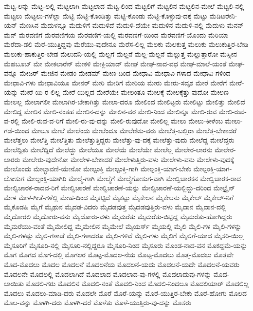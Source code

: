 {ಮೆಟ್ಟ-ಲನ್ನು
ಮೆಟ್ಟ-ಲಲ್ಲಿ
ಮೆಟ್ಟಲಾಗಿ
ಮೆಟ್ಟಲಾದ
ಮೆಟ್ಟ-ಲಿಂದ
ಮೆಟ್ಟಲಿಗೆ
ಮೆಟ್ಟಲಿನ
ಮೆಟ್ಟಲಿನ-ಮೇಲೆ
ಮೆಟ್ಟಲಿ-ನಲ್ಲಿ
ಮೆಟ್ಟಲು
ಮೆಟ್ಟಲು-ಗಳೆಲ್ಲಾ
ಮೆಟ್ಟಿ
ಮೆಟ್ಟಿ-ಕೊಂಡಿತ್ತು
ಮೆಟ್ಟಿ-ಕೊಂಡು
ಮೆಟ್ಟಿ-ಕೊಳ್ಳುವು-ದಕ್ಕೆ
ಮೆಟ್ಟು
ಮೆಡಿಟರೇನಿ-ಯನ್
ಮೆಣಸಿನ
ಮೆದುಳನ್ನೂ
ಮೆದುಳಿಗೆ
ಮೆದುಳಿದೆ
ಮೆದುಳಿ-ದೆಯೇ
ಮೆದುಳಿನ
ಮೆದುಳಿ-ನಲ್ಲಿ
ಮೆದುಳು
ಮೆನನ್
ಮೆನ್
ಮೆರವಣಿಗೆ
ಮೆರವಣಿಗೆಯ
ಮೆರವಣಿಗೆ-ಯಲ್ಲಿ
ಮೆರವಣಿಗೆ-ಯಿಂದ
ಮೆರವಣಿಗೆ-ಯೊಂದು
ಮೆರಿಯಾ
ಮೆರೆದಾ-ಡಲಿ
ಮೆರೆ-ಯುತ್ತಿದ್ದವು
ಮೆರೆಯು-ವುದೇನೂ
ಮೆರೆಸ-ಲಿಲ್ಲ
ಮೆಲಕು
ಮೆಲಕುತ್ತ
ಮೆಲುಕು
ಮೆಲುಕುತ್ತಿರ-ಬೇಡಿ
ಮೆಲುಕು-ಹಾಕುತ್ತಿರ-ಬೇಡ
ಮೆಲುದನಿ-ಯಲ್ಲಿ
ಮೆಲ್ಲಗೆ
ಮೆಲ್ಲನೆ
ಮೆಲ್ಲ-ಮೆಲ್ಲನೆ
ಮೆಲ್ಲುತ್ತ
ಮೆಲ್ಲುತ್ತಾರೋ
ಮೆಸ್ಸೀನ
ಮೆಹಬೂಬ್
ಮೇ
ಮೇಕಲಾರೆನ್
ಮೇಕಳಿ
ಮೇಕ್ಲಿಯಾಡ್
ಮೇಘ
ಮೇಘ-ನಾದ-ವಧ
ಮೇಘ-ಮಾಲೆ-ಯಂತೆ
ಮೇಘ-ವನ್ನೂ
ಮೇಜರ್
ಮೇಜಿನ
ಮೇಡಂ
ಮೇಡಮ್
ಮೇಣ-ದಿಂದ
ಮೇಧಾವಿ
ಮೇಧಾವಿ-ಗಳಾದ
ಮೇಧಾವಿ-ಗಳಿಂದ
ಮೇಧಾವಿ-ಗಳು
ಮೇಧಾವಿಯೂ
ಮೇನರ್
ಮೇರಿ
ಮೇರಿಗೆ
ಮೇರಿಯ
ಮೇರು
ಮೇರು-ಸದೃಶ
ಮೇರೆ
ಮೇರೆಗೆ
ಮೇರೆ-ಯನ್ನು
ಮೇರೆ-ಯಿ-ರ-ಲಿಲ್ಲ
ಮೇರೆ-ಯಿಲ್ಲದ
ಮೇರೆಯೇ
ಮೇಲಂತೂ
ಮೇಲಕ್ಕೆ
ಮೇಲಕ್ಕೆತ್ತು-ವುದೋ
ಮೇಲಣ
ಮೇಲಲ್ಲ
ಮೇಲಾಗಲೀ
ಮೇಲಾಗಿರ-ಬೇಕಾಗಿತ್ತು
ಮೇಲಾ-ದರೂ
ಮೇಲಿಂದ
ಮೇಲಿಟ್ಟರು
ಮೇಲಿಟ್ಟು
ಮೇಲಿತ್ತು
ಮೇಲಿದೆ
ಮೇಲಿದ್ದ
ಮೇಲಿನ
ಮೇಲಿ-ನಂತಹ
ಮೇಲಿನ-ದನ್ನು
ಮೇಲಿನ-ವರ
ಮೇಲಿ-ನಿಂದ
ಮೇಲಿನ್ನೂ
ಮೇಲಿ-ರುವ
ಮೇಲಿ-ರುವ-ವ-ರಲ್ಲಿ
ಮೇಲಿ-ರುವ-ವ-ರಿಗೆ
ಮೇಲಿ-ರು-ವು-ದನ್ನು
ಮೇಲಿ-ರುವುದೋ
ಮೇಲಿಲ್ಲ
ಮೇಲು
ಮೇಲು-ಕೀಳೆಂಬ
ಮೇಲು-ಗಡೆ-ಯಿಂದ
ಮೇಲೂ
ಮೇಲೆ
ಮೇಲೆಂದು
ಮೇಲೆಂದೂ
ಮೇಲೆಣಿಸು-ವರು
ಮೇಲೆತ್ತ-ಬಲ್ಲಿರಾ
ಮೇಲೆತ್ತ-ಬೇಕಾದರೆ
ಮೇಲೆತ್ತಲು
ಮೇಲೆತ್ತಿ
ಮೇಲೆತ್ತಿತು
ಮೇಲೆತ್ತುತ್ತಿದ್ದರು
ಮೇಲೆತ್ತು-ವು-ದಕ್ಕೆ
ಮೇಲೆತ್ತು-ವುದು
ಮೇಲೆದ್ದ
ಮೇಲೆದ್ದರು
ಮೇಲೆದ್ದಿತು
ಮೇಲೆದ್ದಿದೆ
ಮೇಲೆದ್ದು
ಮೇಲೆಯೂ
ಮೇಲೆಯೆ
ಮೇಲೆಯೇ
ಮೇಲೆಲ್ಲ
ಮೇಲೇರ-ಲಾರನು
ಮೇಲೇರ-ಲಾರರು
ಮೇಲೇರು-ವುದೇನೋ
ಮೇಲೇಳ-ಬೇಕಾದರೆ
ಮೇಲೇಳುತ್ತಿರು-ವಳು
ಮೇಲೇಳು-ವನು
ಮೇಲೇಳು-ವುದಕ್ಕೆ
ಮೇಲೊಂದು
ಮೇಲ್ಛಾವಣಿ-ಯೇನೋ
ಮೇಲ್ಪಂಕ್ತಿ
ಮೇಲ್ಪಂಕ್ತಿ-ಗಾಗಿ
ಮೇಲ್ಪಂಕ್ತಿ-ಯಾಗ-ಬೇಕು
ಮೇಲ್ಪಂಕ್ತಿ-ಯಾಗ-ಲೋಸುಗ
ಮೇಲ್ಪಂಕ್ತಿ-ಯಾಗಿರಿ
ಮೇಲ್ಮೆ-ಗಾಗಿ
ಮೇಲ್ಮೆಗೆ
ಮೇಲ್ಮೆಗೋಸುಗ-ವಾಗಿ
ಮೇಲ್ವಿಚಾರಕನ
ಮೇಲ್ವಿಚಾರಕ-ರಾದ
ಮೇಲ್ವಿಚಾರಕ-ರಾದವ-ರಿಗೆ
ಮೇಲ್ವಿಚಾರಣೆ
ಮೇಲ್ವಿಚಾರಣೆ-ಯನ್ನು
ಮೇಲ್ವಿಚಾರಣೆ-ಯಲ್ಲಿದ್ದು-ದರಿಂದ
ಮೇಲ್ಟ್ರೈನ್
ಮೇಳ
ಮೇಳ-ಗೀತೆ-ಗಳೆಲ್ಲಿ
ಮೇಹ-ದಿಂದ
ಮೈಕಟ್ಟಿದೆ
ಮೈಕಟ್ಟು
ಮೈಕೇಲನ
ಮೈಕೇಲನು
ಮೈಕೇಲ್
ಮೈಕೇಲ್-ನಿಗೆ
ಮೈಕೊಡಹಿ
ಮೈಗೆ
ಮೈಥುನ
ಮೈದಡ-ವಿದರು
ಮೈದಡವುತ್ತ
ಮೈದಡವುತ್ತಿರು-ವಳು
ಮೈದಾನ
ಮೈದಾನ-ದಲ್ಲಿ
ಮೈದೋರಲಿ
ಮೈದೋರು-ವನು
ಮೈದೋರು-ವಳು
ಮೈಮರೆತು
ಮೈಮರೆತು-ಬಿಟ್ಟಿದ್ದ
ಮೈಮರೆತು-ಹೋಗಿದ್ದರು
ಮೈಮರೆಯು-ವಂತೆ
ಮೈಮೇಲಿದ್ದ
ಮೈಮೇಲಿನ
ಮೈಮೇಲೆ
ಮೈಯರ್ಸ್
ಮೈಯಲ್ಲಿ
ಮೈಲಿ
ಮೈಲಿ-ಗಳ
ಮೈಲಿ-ಗಳನ್ನು
ಮೈಲಿ-ಗಳಷ್ಟು
ಮೈಲಿ-ಗಳಾಚೆ
ಮೈಲಿ-ಗಳಾದರೂ
ಮೈಲಿ-ಗಳಿವೆ
ಮೈಲಿ-ಗಳು
ಮೈಲಿಗೆ
ಮೈಲಿಗೆ-ಯಾದ
ಮೈಸರಿ-ಯಿಲ್ಲ
ಮೈಸೂರಿಗೆ
ಮೈಸೂರಿ-ನಲ್ಲಿ
ಮೈಸೂರಿ-ನಲ್ಲಿದ್ದರೂ
ಮೈಸೂರಿ-ನಿಂದ
ಮೈಸೂರು
ಮೊಂಡ-ನಾದ-ವನ
ಮೊಕದ್ದಮೆ-ಯನ್ನು
ಮೊಗ
ಮೊಗದ
ಮೊಗ-ದಲ್ಲಿ
ಮೊಗಲರ
ಮೊಟ್ಟ-ಮೊದಲ-ನೆಯ
ಮೊಟ್ಟ-ಮೊದಲು
ಮೊತ್ತ-ಮೊದಲು
ಮೊತ್ತವೇ
ಮೊದ-ಮೊದಲು
ಮೊದಲ
ಮೊದಲನೆ
ಮೊದಲನೆಯ
ಮೊದಲನೆ-ಯದು
ಮೊದಲನೆ-ಯದೇ
ಮೊದಲನೆ-ಯವರು
ಮೊದಲನೇ
ಮೊದಲಲ್ಲಿ
ಮೊದಲಾಗಿದೆ
ಮೊದಲಾದ
ಮೊದಲಾದ-ವು-ಗಳಲ್ಲಿ
ಮೊದಲಾದುವು-ಗಳನ್ನು
ಮೊದ-ಲಾಯಿತು
ಮೊದಲಿ-ಗರು
ಮೊದಲಿನ
ಮೊದಲಿ-ನಂತೆ
ಮೊದಲಿ-ನಿಂದ
ಮೊದಲಿ-ನಿಂದಲೂ
ಮೊದಲಿಯಾರ್
ಮೊದಲಿಲ್ಲ
ಮೊದಲು
ಮೊದಲು-ಮಾಡಿ-ದರು
ಮೊದಲೇ
ಮೊರೆ
ಮೊರೆ-ಯನ್ನು
ಮೊರೆ-ಯುತ್ತಿರ-ಬೇಕು
ಮೊರೆ-ಹೋಗು
ಮೊಲದ
ಮೊಲ-ವನ್ನು
ಮೊಳಗಿ-ದರು
ಮೊಳಗಿ-ದರೆ
ಮೊಳೆತು
ಮೊಳೆ-ಯುತ್ತಿರು-ವು-ದನ್ನು
ಮೊಸರು
}
